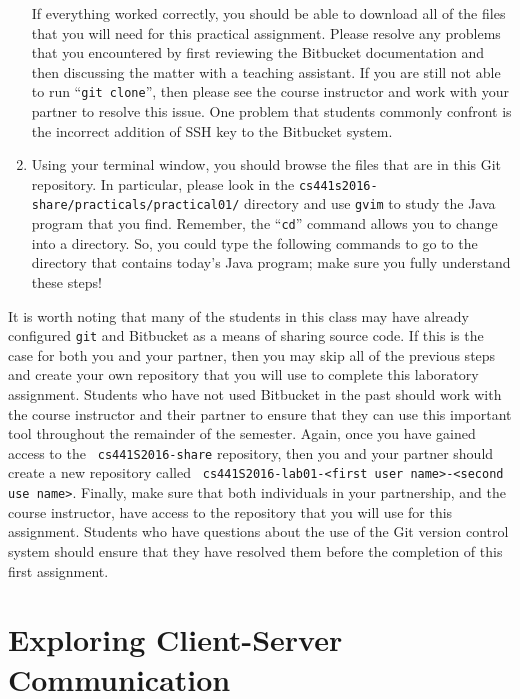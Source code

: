 \begin{enumerate}
    If everything worked correctly, you should be able to download all of the files that you will need for this
    practical assignment. Please resolve any problems that you encountered by first reviewing the Bitbucket
    documentation and then discussing the matter with a teaching assistant.  If you are still not able to run ``{\tt git
      clone}'', then please see the course instructor and work with your partner to resolve this issue. One problem that
      students commonly confront is the incorrect addition of SSH key to the Bitbucket system.

  \item Using your terminal window, you should browse the files that are in this Git repository.  In particular, please
    look in the {\tt cs441s2016-share/practicals/practical01/} directory and use {\tt gvim} to study the Java program that
    you find.  Remember, the ``{\tt cd}'' command allows you to change into a directory. So, you could type the following
    commands to go to the directory that contains today's Java program; make sure you fully understand these steps!

  \end{enumerate}

  It is worth noting that many of the students in this class may have already configured {\tt git} and Bitbucket as a
  means of sharing source code. If this is the case for both you and your partner, then you may skip all of the previous
  steps and create your own repository that you will use to complete this laboratory assignment. Students who have not
  used Bitbucket in the past should work with the course instructor and their partner to ensure that they can use this
  important tool throughout the remainder of the semester. Again, once you have gained access to the {\tt
    cs441S2016-share} repository, then you and your partner should create a new repository called {\tt
  cs441S2016-lab01-<first user name>-<second use name>}. Finally, make sure that both individuals in your partnership, and
  the course instructor, have access to the repository that you will use for this assignment. Students who have questions
  about the use of the Git version control system should ensure that they have resolved them before the completion of this
  first assignment.

\section*{Exploring Client-Server Communication}

